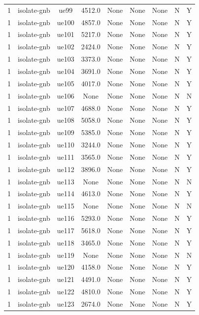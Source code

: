 \begin{table}[ht]
\begin{tabular}{|c|c|c|c|c|c|c|c|c|}
1 & isolate-gnb & ue99 & 4512.0 & None & None & None & N & Y \\
1 & isolate-gnb & ue100 & 4857.0 & None & None & None & N & Y \\
1 & isolate-gnb & ue101 & 5217.0 & None & None & None & N & Y \\
1 & isolate-gnb & ue102 & 2424.0 & None & None & None & N & Y \\
1 & isolate-gnb & ue103 & 3373.0 & None & None & None & N & Y \\
1 & isolate-gnb & ue104 & 3691.0 & None & None & None & N & Y \\
1 & isolate-gnb & ue105 & 4017.0 & None & None & None & N & Y \\
1 & isolate-gnb & ue106 & None & None & None & None & N & N \\
1 & isolate-gnb & ue107 & 4688.0 & None & None & None & N & Y \\
1 & isolate-gnb & ue108 & 5058.0 & None & None & None & N & Y \\
1 & isolate-gnb & ue109 & 5385.0 & None & None & None & N & Y \\
1 & isolate-gnb & ue110 & 3244.0 & None & None & None & N & Y \\
1 & isolate-gnb & ue111 & 3565.0 & None & None & None & N & Y \\
1 & isolate-gnb & ue112 & 3896.0 & None & None & None & N & Y \\
1 & isolate-gnb & ue113 & None & None & None & None & N & N \\
1 & isolate-gnb & ue114 & 4613.0 & None & None & None & N & Y \\
1 & isolate-gnb & ue115 & None & None & None & None & N & N \\
1 & isolate-gnb & ue116 & 5293.0 & None & None & None & N & Y \\
1 & isolate-gnb & ue117 & 5618.0 & None & None & None & N & Y \\
1 & isolate-gnb & ue118 & 3465.0 & None & None & None & N & Y \\
1 & isolate-gnb & ue119 & None & None & None & None & N & N \\
1 & isolate-gnb & ue120 & 4158.0 & None & None & None & N & Y \\
1 & isolate-gnb & ue121 & 4491.0 & None & None & None & N & Y \\
1 & isolate-gnb & ue122 & 4810.0 & None & None & None & N & Y \\
1 & isolate-gnb & ue123 & 2674.0 & None & None & None & N & Y \\

\end{tabular}
\end{table}

